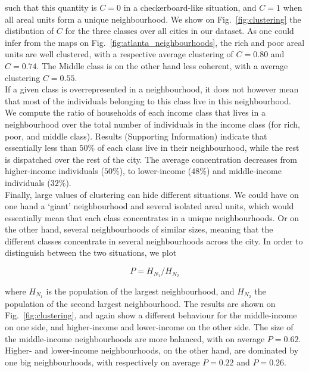 such that this quantity is $C = 0$ in a checkerboard-like situation, and $C = 1$
when all areal units form a unique neighbourhood. We show on
Fig.~\ref{fig:clustering} the distibution of $C$ for the three classes over all
cities in our dataset. As one could infer from the maps on
Fig.~\ref{fig:atlanta_neighbourhoods}, the rich and poor areal units are well
clustered, with a respective average clustering of $C = 0.80$ and $C = 0.74$.
The Middle class is on the other hand less coherent, with a average clustering
$C = 0.55$.\\


If a given class is overrepresented in a neighbourhood, it does not however mean
that most of the individuals belonging to this class live in this neighbourhood.
We compute the ratio of households of each income class that lives in a
neighbourhood over the total number of individuals in the income class (for
rich, poor, and middle class).  Results (Supporting Information) indicate that
essentially less than $50\%$ of each class live in their neighbourhood, while
the rest is dispatched over the rest of the city. The average concentration
decreases from higher-income individuals ($50\%$), to lower-income ($48\%$) and
middle-income individuals ($32\%$).\\

Finally, large values of clustering can hide different situations. We
could have on one hand a `giant' neighbourhood and several isolated areal units, which
would essentially mean that each class concentrates in a unique
neighbourhoods. Or on the other hand, several neighbourhoods of
similar sizes, meaning that the different classes concentrate in
several neighbourhoods across the city. In order to distinguish
between the two situations, we plot

\begin{equation} 
    P = H_{N_1} / H_{N_2} 
\end{equation}

where $H_{N_1}$ is the population of the largest neighbourhood, and $H_{N_2}$
the population of the second largest neighbourhood. The results are shown on
Fig.~\ref{fig:clustering}, and again show a different behaviour for the
middle-income on one side, and higher-income and lower-income on the other side.
The size of the middle-income neighbourhoods are more balanced, with on average
$P=0.62$.  Higher- and lower-income neighbourhoods, on the other hand, are
dominated by one big neighbourhoods, with respectively on average $P=0.22$ and
$P=0.26$.


